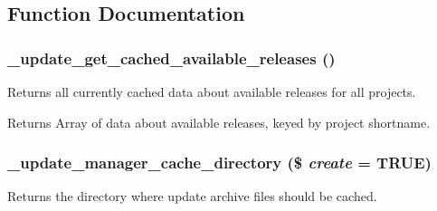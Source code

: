 \subsection{Function Documentation}
\hypertarget{update_8module_a75a2b891e9225f86f6a856730a633a3f}{
\subsubsection[{\_\-update\_\-get\_\-cached\_\-available\_\-releases}]{\setlength{\rightskip}{0pt plus 5cm}\_\-update\_\-get\_\-cached\_\-available\_\-releases ()}}
\label{update_8module_a75a2b891e9225f86f6a856730a633a3f}
Returns all currently cached data about available releases for all projects.

\begin{DoxyReturn}{Returns}
Array of data about available releases, keyed by project shortname. 
\end{DoxyReturn}
\hypertarget{update_8module_a7ccc53a1e104d2b7b8a6b6b87e7b65f5}{
\subsubsection[{\_\-update\_\-manager\_\-cache\_\-directory}]{\setlength{\rightskip}{0pt plus 5cm}\_\-update\_\-manager\_\-cache\_\-directory (\$ {\em create} = {\ttfamily TRUE})}}
\label{update_8module_a7ccc53a1e104d2b7b8a6b6b87e7b65f5}
Returns the directory where update archive files should be cached.



